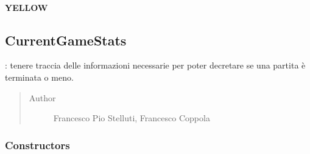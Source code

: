 \documentclass[letterpaper,10pt,italian]{sphinxmanual}
\begin{document}
\paragraph{YELLOW}
\label{\detokenize{source/it/unicam/cs/pa/mastermind/gamecore/ColorPegs:yellow}}

\begin{fulllineitems}
\label{\detokenize{source/it/unicam/cs/pa/mastermind/gamecore/ColorPegs:it.unicam.cs.pa.mastermind.gamecore.ColorPegs.YELLOW}}
\end{fulllineitems}



\subsection{CurrentGameStats}
\label{\detokenize{source/it/unicam/cs/pa/mastermind/gamecore/CurrentGameStats:currentgamestats}}\label{\detokenize{source/it/unicam/cs/pa/mastermind/gamecore/CurrentGameStats::doc}}

\begin{fulllineitems}
\label{\detokenize{source/it/unicam/cs/pa/mastermind/gamecore/CurrentGameStats:it.unicam.cs.pa.mastermind.gamecore.CurrentGameStats}}
: tenere traccia delle informazioni necessarie per poter decretare se una partita è terminata o meno.
\begin{quote}\begin{description}
\item[{Author}] \leavevmode
Francesco Pio Stelluti, Francesco Coppola

\end{description}\end{quote}

\end{fulllineitems}



\subsubsection{Constructors}
\label{\detokenize{source/it/unicam/cs/pa/mastermind/gamecore/CurrentGameStats:constructors}}
\end{document}
